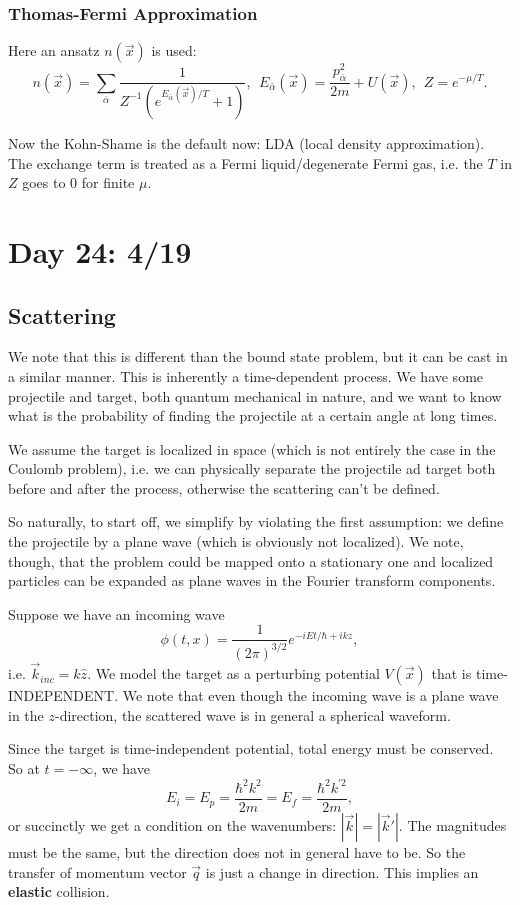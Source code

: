 \documentclass[fontsize=12pt]{scrartcl}
\begin{document}
 \subsubsection{Thomas-Fermi Approximation} Here an ansatz $n(\vec{x})$ is used: $$n(\vec{x}) = \sum_{\bar{\alpha}} \frac{1}{Z^{-1} (e^{E_{\bar{\alpha}}(\vec{x})/T}+1)}, \ \ E_{\bar{\alpha}}(\vec{x}) = \frac{p_{\bar{\alpha}}^2}{2m}+U(\vec{x}), \ \ Z=e^{-\mu/T}.$$


Now the Kohn-Shame is the default now: LDA (local density approximation). The exchange term is treated as a Fermi liquid/degenerate Fermi gas, i.e. the $T$ in $Z$ goes to 0 for finite $\mu$.

\section{Day 24: 4/19}
\subsection{Scattering}

We note that this is different than the bound state problem, but it can be cast in a similar manner. This is inherently a time-dependent process. We have some projectile and target, both quantum mechanical in nature, and we want to know what is the probability of finding the projectile at a certain angle at long times.

We assume the target is localized in space (which is not entirely the case in the Coulomb problem), i.e. we can physically separate the projectile ad target both before and after the process, otherwise the scattering can't be defined.

So naturally, to start off, we simplify by violating the first assumption: we define the projectile by a plane wave (which is obviously not localized). We note, though, that the problem could be mapped onto a stationary one and localized particles can be expanded as plane waves in the Fourier transform components.

Suppose we have an incoming wave $$\phi(t,x) = \frac{1}{(2\pi)^{3/2}} e^{-iEt/\hbar + ikz},$$ i.e. $\vec{k}_{inc}=k\hat{z}$. We model the target as a perturbing potential $V(\vec{x})$ that is time-INDEPENDENT. We note that even though the incoming wave is a plane wave in the $z$-direction, the scattered wave is in general a spherical waveform.

Since the target is time-independent potential, total energy must be conserved. So at $t=-\infty$, we have $$E_i = E_p = \frac{\hbar^2k^2}{2m} = E_f = \frac{\hbar^2k^{'2}}{2m},$$ or succinctly we get a condition on the wavenumbers: $|\vec{k}|=|\vec{k}'|$. The magnitudes must be the same, but the direction does not in general have to be. So the transfer of momentum vector $\vec{q}$ is just a change in direction. This implies an \textbf{elastic} collision.
\end{document}
